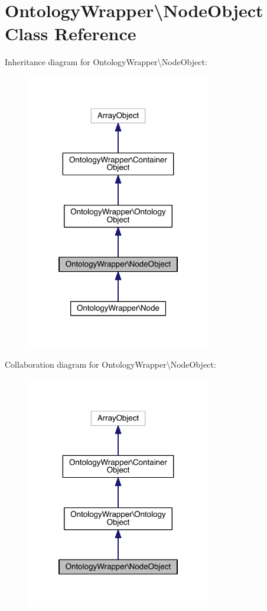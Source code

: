 \hypertarget{class_ontology_wrapper_1_1_node_object}{\section{Ontology\-Wrapper\textbackslash{}Node\-Object Class Reference}
\label{class_ontology_wrapper_1_1_node_object}
}


Inheritance diagram for Ontology\-Wrapper\textbackslash{}Node\-Object\-:
\nopagebreak
\begin{figure}[H]
\begin{center}
\leavevmode
\includegraphics[width=228pt]{class_ontology_wrapper_1_1_node_object__inherit__graph}
\end{center}
\end{figure}


Collaboration diagram for Ontology\-Wrapper\textbackslash{}Node\-Object\-:
\nopagebreak
\begin{figure}[H]
\begin{center}
\leavevmode
\includegraphics[width=228pt]{class_ontology_wrapper_1_1_node_object__coll__graph}
\end{center}
\end{figure}
